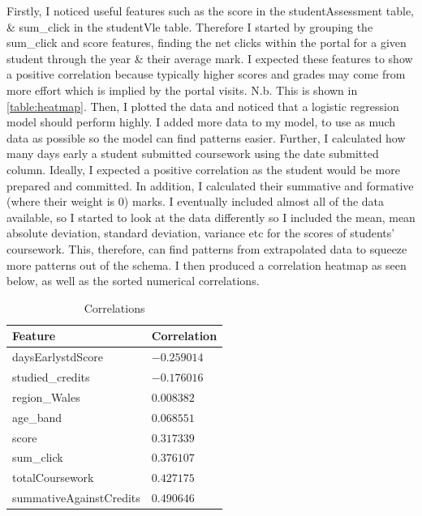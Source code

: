 \documentclass[11pt, a4paper, twocolumn]{article}
\begin{document}
Firstly, I noticed useful features such as the score in the studentAssessment table, \& sum\_click in the studentVle table.
Therefore I started by grouping the sum\_click and score features, finding the net clicks within the portal for a given student through the year \& their average mark. 
I expected these features to show a positive correlation because typically higher scores and grades may come from more effort which is implied by the portal visits. N.b. This is shown in \ref{table:heatmap}.
Then, I plotted the data and noticed that a logistic regression model should perform highly. 
I added more data to my model, to use as much data as possible so the model can find patterns easier.
Further, I calculated how many days early a student submitted coursework using the date submitted column.
Ideally, I expected a positive correlation as the student would be more prepared and committed.
In addition, I calculated their summative and formative (where their weight is 0) marks. 
I eventually included almost all of the data available, so I started to look at the data differently so I included the mean, mean absolute deviation, standard deviation, variance etc for the scores of students' coursework.
This, therefore, can find patterns from extrapolated data to squeeze more patterns out of the schema. 
I then produced a correlation heatmap as seen below, as well as the sorted numerical correlations.


\begin{table}[H]
	\centering
	\begin{tabular}{|l|l|}
		\hline
		Feature                    & Correlation \\ \hline
		daysEarlystdScore            & $-0.259014$ \\ \hline
		studied\_credits             & $-0.176016$ \\ \hline
		region\_Wales                & $0.008382$  \\ \hline
		age\_band                    & $0.068551$  \\ \hline
		score                        & $0.317339$  \\ \hline
		sum\_click                   & $0.376107$  \\ \hline
		totalCoursework              & $0.427175$  \\ \hline
		summativeAgainstCredits      & $0.490646$  \\ \hline
		\end{tabular}
		\caption{Correlations}
		\label{table:Correlations}
\end{table}
\end{document}
